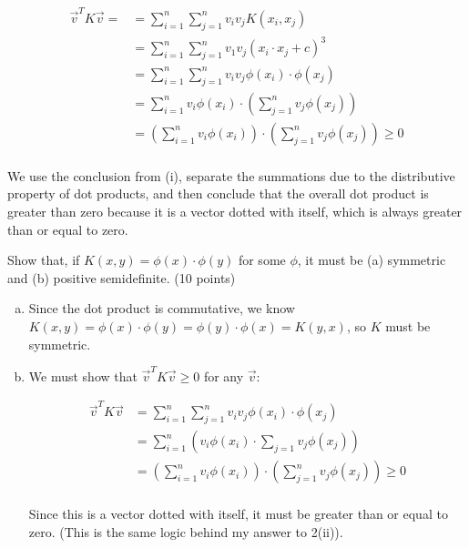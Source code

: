 \documentclass[fleqn]{homework}
\begin{document}
\begin{problem}{2}
\begin{enumerate}[(i)]
      \begin{align*}
        \vec{v}^T K \vec{v}=
        &= \sum_{i=1}^n \sum_{j=1}^n v_i v_j K(x_i, x_j) \\
        &= \sum_{i=1}^n \sum_{j=1}^n v_1 v_j (x_i \cdot x_j + c)^3 \\
        &= \sum_{i=1}^n \sum_{j=1}^n v_i v_j \phi(x_i) \cdot \phi(x_j) \\
        &= \sum_{i=1}^n v_i \phi(x_i) \cdot \left(\sum_{j=1}^n v_j \phi(x_j)\right) \\
        &= \left(\sum_{i=1}^n v_i \phi(x_i)\right) \cdot \left(\sum_{j=1}^n v_j \phi(x_j)\right) \ge 0 \\
      \end{align*}

      We use the conclusion from (i), separate the summations due to the
      distributive property of dot products, and then conclude that the overall
      dot product is greater than zero because it is a vector dotted with
      itself, which is always greater than or equal to zero.
    \end{enumerate}
  \end{problem}

  \begin{problem}{3}
    \begin{question}
      Show that, if $K(x,y) = \phi(x) \cdot \phi(y)$ for some $\phi$, it must be
      (a) symmetric and (b) positive semidefinite. (10 points)
    \end{question}

    \begin{enumerate}[(a)]
    \item Since the dot product is commutative, we know
      $K(x,y) = \phi(x) \cdot \phi(y) = \phi(y) \cdot \phi(x) = K(y,x)$, so $K$
      must be symmetric.
    \item We must show that $\vec{v}^T K \vec{v} \ge 0$ for any $\vec{v}$:

      \begin{align*}
        \vec{v}^T K \vec{v} &= \sum_{i=1}^n \sum_{j=1}^n v_i v_j \phi(x_i) \cdot \phi(x_j) \\
        &= \sum_{i=1}^n \left(v_i \phi(x_i) \cdot \sum_{j=1} v_j \phi(x_j) \right) \\
        &= \left(\sum_{i=1}^n v_i \phi(x_i)\right) \cdot \left(\sum_{j=1}^n v_j \phi(x_j)\right) \ge 0\\
      \end{align*}

      Since this is a vector dotted with itself, it must be greater than or
      equal to zero.  (This is the same logic behind my answer to 2(ii)).
    \end{enumerate}
  \end{problem}
\end{document}
